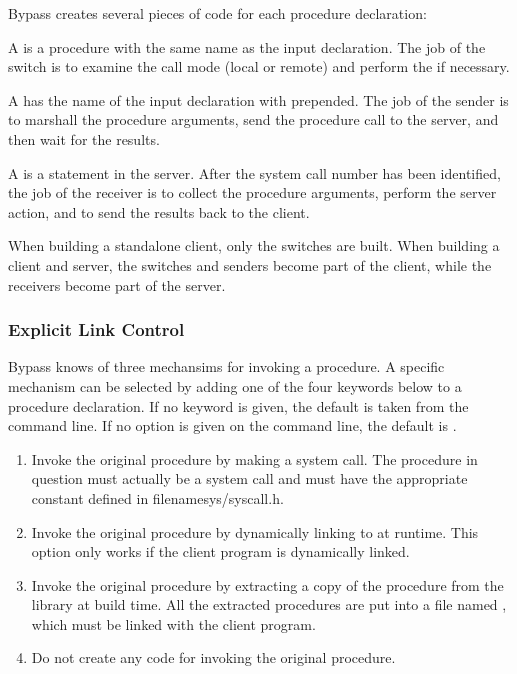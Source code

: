 Bypass creates several pieces of code for each procedure declaration:

A  is a procedure with the same name as the input declaration. The job of the switch is to examine the call mode (local or remote) and perform the  if necessary.

A  has the name of the input declaration with  prepended.  The job of the sender is to marshall the procedure arguments, send the procedure call to the server, and then wait for the results.

A  is a  statement in the server.  After the system call number has been identified, the job of the receiver is to collect the procedure arguments, perform the server action, and to send the results back to the client.

When building a standalone client, only the switches are built.
When building a client and server, the switches and senders become part of the client, while the receivers become part of the server.

\subsubsection{Explicit Link Control}

Bypass knows of three mechansims for invoking a procedure.  A specific mechanism can be selected by adding one of the four keywords below to a procedure declaration.  If no keyword is given, the default is taken from the command line.  If no option is given on the command line, the default is .

\begin{enumerate}
\item[\Keyword{syscall}] Invoke the original procedure by making a system call.  The procedure in question must actually be a system call and must have the appropriate  constant defined in filename{sys/syscall.h}.
\item[\Keyword{dynamic} \[\"library\"\]] Invoke the original procedure by dynamically linking to at runtime.  This option only works if the client program is dynamically linked.
\item[\Keyword{static} \[\"library\"\]] Invoke the original procedure by extracting a copy of the procedure from the library at build time.  All the extracted procedures are put into a file named , which must be linked with the client program.
\item[\Keyword{plain}] Do not create any code for invoking the original procedure.
\end{enumerate}

